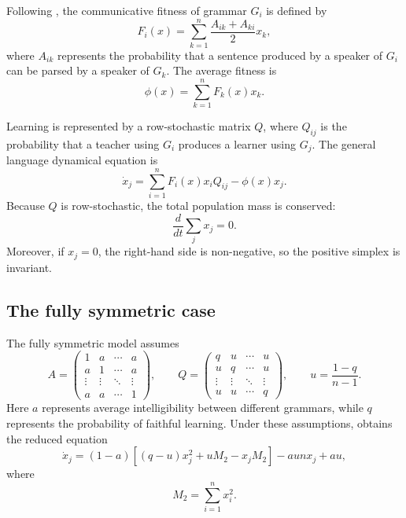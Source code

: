 \documentclass[11pt]{article}
\begin{document}
Following \citet{mitchener2003bifurcation}, the communicative fitness of grammar $G_i$ is defined by
\begin{equation}
F_i(x)=\sum_{k=1}^n \frac{A_{ik}+A_{ki}}{2}x_k,
\end{equation}
where $A_{ik}$ represents the probability that a sentence produced by a speaker of $G_i$ can be parsed by a speaker of $G_k$. The average fitness is
\begin{equation}
\phi(x)=\sum_{k=1}^n F_k(x)x_k.
\end{equation}

Learning is represented by a row-stochastic matrix $Q$, where $Q_{ij}$ is the probability that a teacher using $G_i$ produces a learner using $G_j$. The general language dynamical equation is
\begin{equation}
\dot{x}_j = \sum_{i=1}^n F_i(x)x_iQ_{ij} - \phi(x)x_j.
\label{eq:general-lde}
\end{equation}
Because $Q$ is row-stochastic, the total population mass is conserved:
\[
\frac{d}{dt}\sum_j x_j = 0.
\]
Moreover, if $x_j=0$, the right-hand side is non-negative, so the positive simplex is invariant.

\subsection{The fully symmetric case}

The fully symmetric model assumes
\begin{equation}
A =
\begin{pmatrix}
1 & a & \cdots & a \\
a & 1 & \cdots & a \\
\vdots & \vdots & \ddots & \vdots \\
a & a & \cdots & 1
\end{pmatrix},
\qquad
Q =
\begin{pmatrix}
q & u & \cdots & u \\
u & q & \cdots & u \\
\vdots & \vdots & \ddots & \vdots \\
u & u & \cdots & q
\end{pmatrix},
\qquad
u=\frac{1-q}{n-1}.
\end{equation}
Here $a$ represents average intelligibility between different grammars, while $q$ represents the probability of faithful learning. Under these assumptions, \citet{mitchener2003bifurcation} obtains the reduced equation
\begin{equation}
\dot{x}_j = (1-a)\left[(q-u)x_j^2 + uM_2 - x_jM_2\right] - aunx_j + au,
\label{eq:symmetric-lde}
\end{equation}
where
\begin{equation}
M_2=\sum_{i=1}^n x_i^2.
\end{equation}
\end{document}
